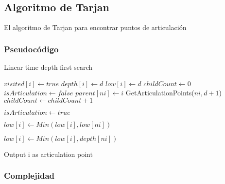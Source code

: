 \subsection{Algoritmo de Tarjan}
El algoritmo de Tarjan para encontrar puntos de articulación
\subsubsection{Pseudocódigo}
\begin{algorithm}
	\caption{Linear time depth first search}
	\begin{algorithmic}		
			\State $visited[i] \leftarrow true$
			\State $depth[i] \leftarrow d$
			\State $low[i] \leftarrow d$
			\State $childCount \leftarrow 0$
			\State $isArticulation \leftarrow false$
					\State $parent[ni] \leftarrow i$
					\State GetArticulationPoints($ni, d + 1$)
					\State $childCount \leftarrow childCount + 1$
					
						\State $isArticulation \leftarrow true$
					\EndIf
					
					\State $low[i] \leftarrow Min(low[i], low[ni])$
					
					\State $low[i] \leftarrow Min(low[i], depth[ni])$
				\EndIf
			\EndFor
			
				\State 
				\Return Output i as articulation point
			\EndIf
		\EndFunction
	\end{algorithmic}
\end{algorithm}


\subsubsection{Complejidad}
